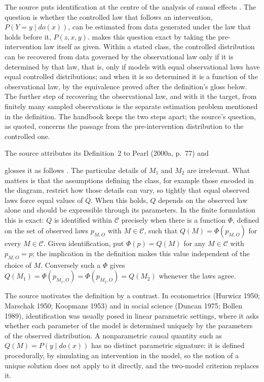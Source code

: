 The source puts identification at the centre of the analysis of causal
effects \cite[sec.~3.2.1, p.~108]{Pearl2009CausalOverview}. The question
is whether the controlled law that follows an intervention,
\(P(Y=y\mid do(x))\), can be estimated from data generated under the law
that holds before it, \(P(z,x,y)\).
 makes this question exact by taking
the pre-intervention law itself as given. Within a stated class, the
controlled distribution can be recovered from data governed by the
observational law only if it is determined by that law, that is, only if
models with equal observational laws have equal controlled distributions;
and when it is so determined it is a function of the observational law,
by the equivalence proved after the definition's gloss below. The further
step of recovering the observational law, and with it the target, from
finitely many sampled observations is the separate estimation problem
mentioned in the definition. The handbook keeps the two steps apart; the
source's question, as quoted, concerns the passage from the
pre-intervention distribution to the controlled one.

The source attributes its Definition~2 to Pearl (2000a, p.~77) and

glosses it as follows \cite[sec.~3.2.1, pp.~108--109]{Pearl2009CausalOverview}.
The particular details of \(M_1\) and \(M_2\) are irrelevant. What
matters is that the assumptions defining the class, for example those
encoded in the diagram, restrict how those details can vary, so tightly
that equal observed laws force equal values of \(Q\). When this holds,
\(Q\) depends on the observed law alone and should be expressible through
its parameters. In the finite formulation this is exact: \(Q\) is
identified within \(\mathcal C\) precisely when there is a function
\(\Phi\), defined on the set of observed laws \(p_{M,O}\) with
\(M\in\mathcal C\), such that \(Q(M)=\Phi(p_{M,O})\) for every
\(M\in\mathcal C\). Given identification, put
\(\Phi(p)=Q(M)\) for any \(M\in\mathcal C\) with \(p_{M,O}=p\); the
implication in the definition makes this value independent of the
choice of \(M\). Conversely such a \(\Phi\) gives
\(Q(M_1)=\Phi(p_{M_1,O})=\Phi(p_{M_2,O})=Q(M_2)\) whenever the laws
agree.

The source motivates the definition by a contrast. In econometrics
(Hurwicz 1950; Marschak 1950; Koopmans 1953) and in social science
(Duncan 1975; Bollen 1989), identification was usually posed in linear
parametric settings, where it asks whether each parameter of the model
is determined uniquely by the parameters of the observed
distribution. A nonparametric causal quantity such as
\(Q(M)=P(y\mid do(x))\) has no distinct parametric signature: it is
defined procedurally, by simulating an intervention in the model, so
the notion of a unique solution does not apply to it directly, and the
two-model criterion replaces it.

